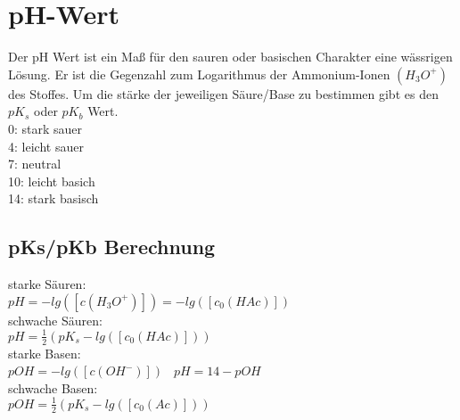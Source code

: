 \section{pH-Wert} \label{sec:ph_wert}

Der pH Wert ist ein Maß für den sauren oder basischen Charakter eine wässrigen Lösung.
Er ist die Gegenzahl zum Logarithmus der Ammonium-Ionen $(H_3O^+)$ des Stoffes.
Um die stärke der jeweiligen Säure/Base zu bestimmen gibt es den \hyperref[sec:pks_pkb]{$pK_s$} oder \hyperref[sec:pks_pkb]{$pK_b$} Wert. \\
0: stark sauer \\
4: leicht sauer \\
7: neutral \\
10: leicht basich \\
14: stark basisch

\subsection{pKs/pKb Berechnung}
starke Säuren: \\
$pH = -lg([c(H_3O^+)]) = -lg([c_0(HAc)])$ \\
schwache Säuren: \\
$pH = \frac{1}{2} (pK_s - lg([c_0(HAc)]))$ \\
starke Basen: \\
$pOH = -lg([c(OH^-)])$ \textrightarrow\ $pH = 14 - pOH$ \\
schwache Basen: \\
$pOH = \frac{1}{2} (pK_s - lg([c_0(Ac)]))$ \\
